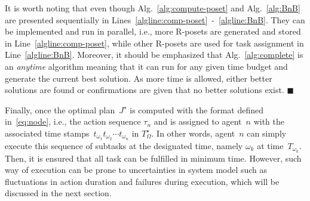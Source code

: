 \begin{remark}\label{remark:parallel}
It is worth noting that even though Alg.~\ref{alg:compute-poset} and
Alg.~\ref{alg:BnB} are presented sequentially in
Lines~\ref{algline:comp-poset}~-~\ref{algline:BnB}.
They can be implemented and run {in parallel}, i.e., more R-posets are
generated and stored in Line~\ref{algline:comp-poset},
while other R-posets are used for task assignment in Line~\ref{algline:BnB}.
Moreover, it should be emphasized that Alg.~\ref{alg:complete} is an \emph{anytime}
algorithm meaning that it can run for any given time budget and generate the
current best solution.
As more time is allowed, either better solutions are found or confirmations are
given that no better solutions exist.
\hfill  $\blacksquare$
\end{remark}




Finally, once the optimal plan~$J^\star$ is computed with the format
defined in~\eqref{eq:node}, i.e.,
the action sequence $\tau_n$ and is assigned
to agent~$n$ with the associated time stamps~$t_{\omega_1}t_{\omega_2}\cdots t_{\omega_n}$ in $T^\star_\Omega$.
In other words,
agent~$n$ can simply execute this sequence of subtasks at the designated time,
namely $\omega_k$ at time~$T_{\omega_k}$.
Then, it is ensured that all task can be fulfilled in minimum time.
However, such way of execution can be prone to uncertainties in system model
such as fluctuations in action duration
and failures during execution, which will be discussed in the next section.

